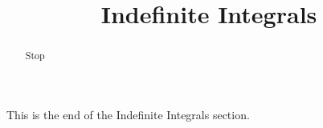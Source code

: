 \documentclass[handout]{ximera}
\title{Indefinite Integrals}
\begin{document}
\begin{abstract} Stop
\end{abstract}

\maketitle

This is the end of the Indefinite Integrals section.
\end{document}
